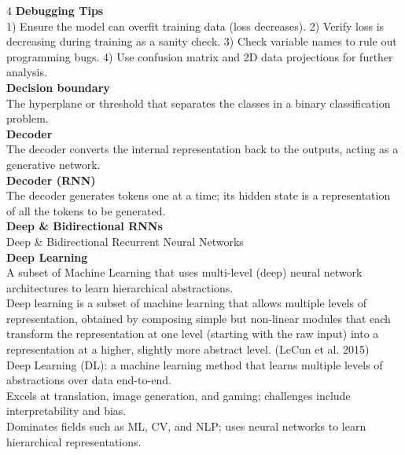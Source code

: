 \documentclass[8pt]{extarticle}
\begin{document}
\begin{multicols}{4}
\vspace{2pt}\textbf{Debugging Tips}\\
1) Ensure the model can overfit training data (loss decreases). 2) Verify loss is decreasing during training as a sanity check. 3) Check variable names to rule out programming bugs. 4) Use confusion matrix and 2D data projections for further analysis.\\
\vspace{2pt}\textbf{Decision boundary}\\
The hyperplane or threshold that separates the classes in a binary classification problem.\\
\vspace{2pt}\textbf{Decoder}\\
The decoder converts the internal representation back to the outputs, acting as a generative network.\\
\vspace{2pt}\textbf{Decoder (RNN)}\\
The decoder generates tokens one at a time; its hidden state is a representation of all the tokens to be generated.\\
\vspace{2pt}\textbf{Deep \& Bidirectional RNNs}\\
Deep \& Bidirectional Recurrent Neural Networks\\
\vspace{2pt}\textbf{Deep Learning}\\
A subset of Machine Learning that uses multi-level (deep) neural network architectures to learn hierarchical abstractions.\\
Deep learning is a subset of machine learning that allows multiple levels of representation, obtained by composing simple but non-linear modules that each transform the representation at one level (starting with the raw input) into a representation at a higher, slightly more abstract level. (LeCun et al. 2015)\\
Deep Learning (DL): a machine learning method that learns multiple levels of abstractions over data end-to-end.\\
Excels at translation, image generation, and gaming; challenges include interpretability and bias.\\
Dominates fields such as ML, CV, and NLP; uses neural networks to learn hierarchical representations.\\


\end{multicols}
\end{document}
